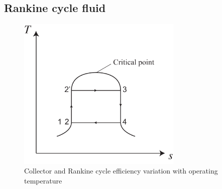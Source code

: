 \subsection{Rankine cycle fluid}
\label{sec:RankineCycleFluid}

\begin{figure}[!ht]
\centering 
\includegraphics[width=0.7\textwidth]{fig/idealTs}
\caption{Collector and Rankine cycle efficiency variation with operating temperature}\label{fig:idealTs}
\end{figure}


